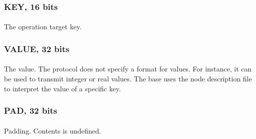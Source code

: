 \documentclass[a4paper, 11pt]{article}
\begin{document}
\subsubsection{KEY, 16 bits}
\paragraph{}
The operation target key.

\subsubsection{VALUE, 32 bits}
\paragraph{}
The value. The protocol does not specify a format for values. For instance, it
can be used to transmit integer or real values. The base uses the node description
file to interpret the value of a specific key.

\subsubsection{PAD, 32 bits}
\paragraph{}
Padding. Contents is undefined.
\end{document}
